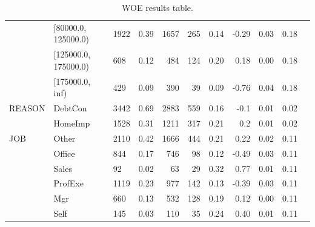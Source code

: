 \begin{landscape}
\begin{table}[!ht]
\begin{tabular}{lllrrrrrrrr}
    &   [80000.0, 125000.0) &   1922 &         0.39 &  1657 &  265 &     0.14 & -0.29 &    0.03 &      0.18 \\
    &  [125000.0, 175000.0) &    608 &         0.12 &   484 &  124 &     0.20 &  0.18 &    0.00 &      0.18 \\
    &       [175000.0, inf) &    429 &         0.09 &   390 &   39 &     0.09 & -0.76 &    0.04 &      0.18 \\
			\midrule
			  REASON &  DebtCon &   3442 &         0.69 &  2883 &  559 &     0.16 & -0.1 &    0.01 &      0.02 \\
   &  HomeImp &   1528 &         0.31 &  1211 &  317 &     0.21 &  0.2 &    0.01 &      0.02 \\
			\midrule
			      JOB &    Other &   2110 &         0.42 &  1666 &  444 &     0.21 &  0.22 &    0.02 &      0.11 \\
      &   Office &    844 &         0.17 &   746 &   98 &     0.12 & -0.49 &    0.03 &      0.11 \\
      &    Sales &     92 &         0.02 &    63 &   29 &     0.32 &  0.77 &    0.01 &      0.11 \\
      &  ProfExe &   1119 &         0.23 &   977 &  142 &     0.13 & -0.39 &    0.03 &      0.11 \\
      &      Mgr &    660 &         0.13 &   532 &  128 &     0.19 &  0.12 &    0.00 &      0.11 \\
      &     Self &    145 &         0.03 &   110 &   35 &     0.24 &  0.40 &    0.01 &      0.11 \\
			
			\bottomrule
		\end{tabular}
		\caption{WOE results table. \label{woe_1}}
	\end{table}
	

\end{landscape}
